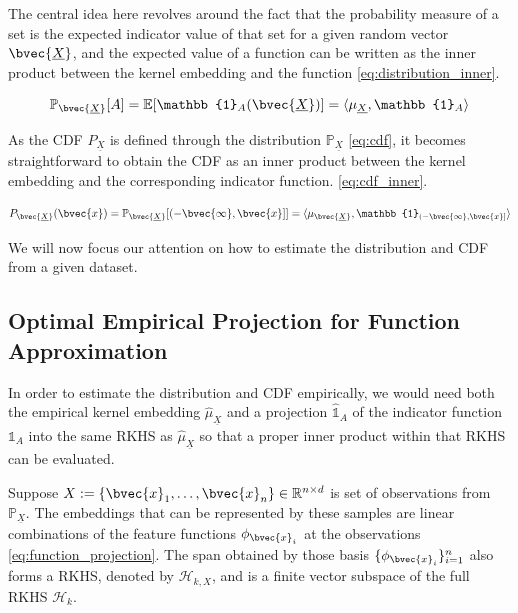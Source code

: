 \documentclass[twoside]{article} \usepackage{aistats2017}
\newcommand{\rv}[1]{\underline{#1}}
\newcommand{\ds}[1]{{#1}}
\begin{document}
	The central idea here revolves around the fact that the probability measure of a set is the expected indicator value of that set for a given random vector $\bvec{\rv{X}}$, and the expected value of a function can be written as the inner product between the kernel embedding and the function \eqref{eq:distribution_inner}.
	
	\begin{equation}
		\mathbb{P}_{\bvec{\rv{X}}}[A] = \mathbb{E}[\mathbb{1}_{A}(\bvec{\rv{X}})] = \langle \mu_{\rv{X}}, \mathbb{1}_{A} \rangle
	\label{eq:distribution_inner}
	\end{equation}
	
	As the CDF $P_{\rv{X}}$ is defined through the distribution $\mathbb{P}_{\rv{X}}$ \eqref{eq:cdf}, it becomes straightforward to obtain the CDF as an inner product between the kernel embedding and the corresponding indicator function. \eqref{eq:cdf_inner}.
	
	\begin{equation}
		P_{\bvec{\rv{X}}}(\bvec{x}) = \mathbb{P}_{\bvec{\rv{X}}}[(-\bvec{\infty}, \bvec{x}]] = \langle \mu_{\bvec{\rv{X}}}, \mathbb{1}_{(-\bvec{\infty}, \bvec{x}]} \rangle
	\label{eq:cdf_inner}
	\end{equation}
	
	We will now focus our attention on how to estimate the distribution and CDF from a given dataset.
	
	\subsection{Optimal Empirical Projection for Function Approximation}

		In order to estimate the distribution and CDF empirically, we would need both the empirical kernel embedding $\hat{\mu}_{\rv{X}}$ and a projection $\hat{\mathbb{1}}_{A}$ of the indicator function $\mathbb{1}_{A}$ into the same RKHS as $\hat{\mu}_{\rv{X}}$ so that a proper inner product within that RKHS can be evaluated.

		Suppose $\ds{X} := \{\bvec{x}_{1}, \dots, \bvec{x}_{n}\} \in \mathbb{R}^{n \times d}$ is set of observations from $\mathbb{P}_{\rv{X}}$. The embeddings that can be represented by these samples are linear combinations of the feature functions $\phi_{\bvec{x}_{i}}$ at the observations \eqref{eq:function_projection}. The span obtained by those basis $\{\phi_{\bvec{x}_{i}}\}_{i = 1}^{n}$ also forms a RKHS, denoted by $\mathcal{H}_{k, \ds{X}}$, and is a finite vector subspace of the full RKHS $\mathcal{H}_{k}$.
		
\end{document}
